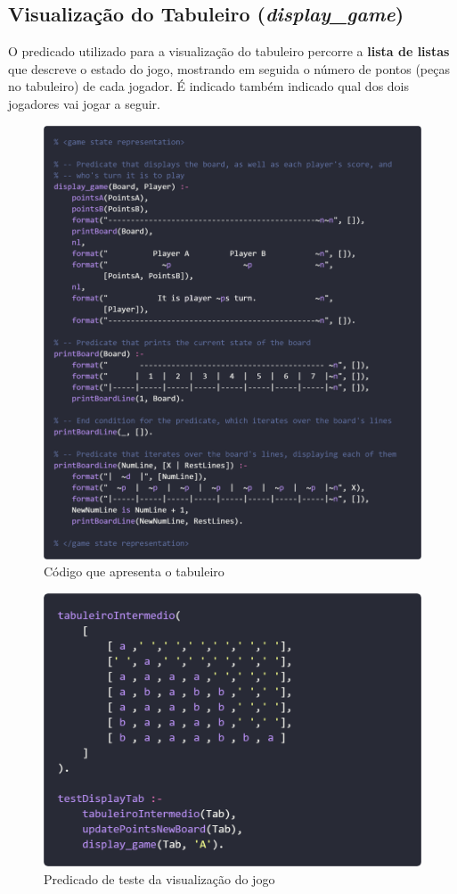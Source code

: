 \documentclass[a4paper]{article}
\begin{document}
\newpage\subsection{Visualização do Tabuleiro (\textit{display\_game})} 

\bigskip
O predicado utilizado para a visualização do tabuleiro percorre a \textbf{lista de listas} que descreve o estado do jogo, mostrando em seguida o número de pontos (peças no tabuleiro) de cada jogador. É indicado também indicado qual dos dois jogadores vai jogar a seguir.

\bigskip
\begin{figure}[hbp!]
    \centering
    \includegraphics[width=\linewidth]{prints/game-representation.png}
    \caption{Código que apresenta o tabuleiro}
    \label{fig}
\end{figure}

\newpage
\begin{figure}[hbp!]
    \centering
    \includegraphics[width=.65\linewidth]{prints/test-tabuleiro.png}
    \caption{Predicado de teste da visualização do jogo}
    \label{fig}
\end{figure}
\end{document}
